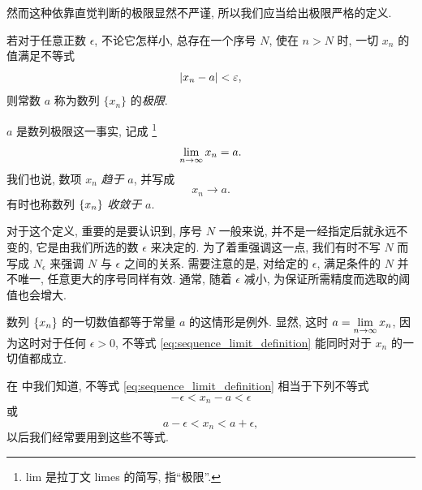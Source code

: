 然而这种依靠直觉判断的极限显然不严谨, 所以我们应当给出极限严格的定义.

{\kaishu
    若对于任意正数 $\epsilon$, 不论它怎样小, 总存在一个序号 $N$, 使在 $n>N$ 时, 一切 $x_n$ 的值满足不等式
    \begin{equation} \label{eq:sequence_limit_definition}
        \left| x_n-a \right|<\varepsilon,
    \end{equation}
    则常数 $a$ 称为数列 $\{x_n\}$ 的\emph{极限}.
}

$a$ 是数列极限这一事实, 记成 \footnote{lim 是拉丁文 limes 的简写, 指“极限”.}
$$
\lim\limits_{n \to \infty} x_n =a.
$$
我们也说, 数项 $x_n$ \emph{趋于} $a$, 并写成
$$
x_n \to a.
$$
有时也称数列 $\{x_{n}\}$ \emph{收敛于} $a$.

对于这个定义, 重要的是要认识到, 序号 $N$ 一般来说, 并不是一经指定后就永远不变的,
{\kaishu 它是由我们所选的数 $\epsilon$ 来决定的}.
为了着重强调这一点, 我们有时不写 $N$ 而写成 $N_{\epsilon}$ 来强调 $N$ 与 $\epsilon$ 之间的关系.
需要注意的是, 对给定的 $\epsilon$, 满足条件的 $N$ 并不唯一, 任意更大的序号同样有效.
通常, 随着 $\epsilon$ 减小, 为保证所需精度而选取的阈值也会增大.

数列 $\{x_{n}\}$ 的一切数值都等于常量 $a$ 的这情形是例外.
显然, 这时 $a = \displaystyle \lim\limits_{n \to \infty} x_n$,
因为这时对于任何 $\epsilon > 0$, 不等式 \eqref{eq:sequence_limit_definition} 能同时对于 $x_n$ 的一切值都成立.

在  中我们知道, 不等式 \eqref{eq:sequence_limit_definition} 相当于下列不等式
$$
-\epsilon < x_n - a < \epsilon
$$
或
\begin{equation} \label{eq:limit_inequality}
a - \epsilon < x_n < a + \epsilon,
\end{equation}
以后我们经常要用到这些不等式.

